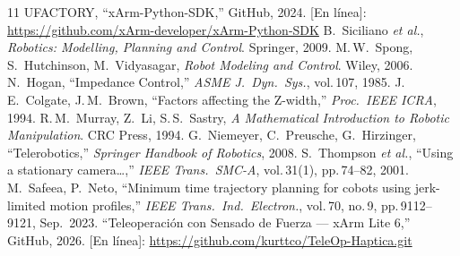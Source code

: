 \documentclass[journal,10pt,twoside]{IEEEtran}
\newcommand{\xarm}{xArm Lite 6}
\begin{document}
\begin{thebibliography}{11}
  UFACTORY, ``xArm-Python-SDK,'' GitHub, 2024.
  [En línea]: \url{https://github.com/xArm-developer/xArm-Python-SDK}
  B.~Siciliano \textit{et al.},
  \textit{Robotics: Modelling, Planning and Control}. Springer, 2009.
  M.\,W.~Spong, S.~Hutchinson, M.~Vidyasagar,
  \textit{Robot Modeling and Control}. Wiley, 2006.
  N.~Hogan, ``Impedance Control,''
  \textit{ASME J.\ Dyn.\ Sys.}, vol.\,107, 1985.
  J.\,E.~Colgate, J.\,M.~Brown, ``Factors affecting the Z-width,''
  \textit{Proc.\ IEEE ICRA}, 1994.
  R.\,M.~Murray, Z.~Li, S.\,S.~Sastry,
  \textit{A Mathematical Introduction to Robotic Manipulation}.
  CRC Press, 1994.
  G.~Niemeyer, C.~Preusche, G.~Hirzinger, ``Telerobotics,''
  \textit{Springer Handbook of Robotics}, 2008.
  S.~Thompson \textit{et al.},
  ``Using a stationary camera\ldots,''
  \textit{IEEE Trans.\ SMC-A}, vol.\,31(1), pp.\,74--82, 2001.
  M.~Safeea, P.~Neto,
  ``Minimum time trajectory planning for cobots
  using jerk-limited motion profiles,''
  \textit{IEEE Trans.\ Ind.\ Electron.}, vol.\,70, no.\,9,
  pp.\,9112--9121, Sep.\ 2023.
  ``Teleoperaci\'on con Sensado de Fuerza --- \xarm{},''
  GitHub, 2026.
  [En l\'inea]: \url{https://github.com/kurttco/TeleOp-Haptica.git}
\end{thebibliography}
\end{document}
